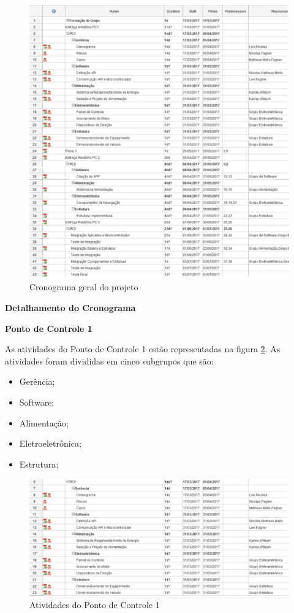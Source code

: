 	\graphicspath{{figuras/}}
	\begin{figure}[h!]
	\centering
	\includegraphics[width=\textwidth]{cronograma_geral}
	\caption{Cronograma geral do projeto}
	\label{img:cronograma_geral}
	\end{figure}
	
	\newpage
	
	\textbf{Detalhamento do Cronograma}
	
		\textbf{Ponto de Controle 1}
		
		As atividades do Ponto de Controle 1 estão representadas na figura \ref{img:PC1}. As atividades foram divididas em cinco subgrupos que são:
		
		\begin{itemize}
			\item Gerência;
			\item Software;
			\item Alimentação;
			\item Eletroeletrônica;
			\item Estrutura;
		\end{itemize}	
		
		\graphicspath{{figuras/}}
		\begin{figure}[h!]
			\centering
			\includegraphics[width=\textwidth]{PC1}
			\caption{Atividades do Ponto de Controle 1}
			\label{img:PC1}
		\end{figure}	
		
